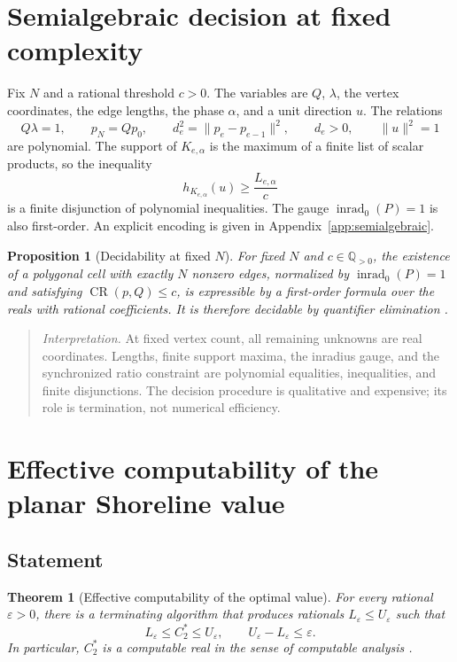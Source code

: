\documentclass[10pt,a4paper]{article}
\newtheorem{theorem}{Theorem}[section]
\newtheorem{proposition}[proposition]{Proposition}
\theoremstyle{definition}
\theoremstyle{remark}
\DeclareMathOperator{\inrad}{inrad}
\DeclareMathOperator{\CR}{CR}
\newcommand{\norm}[1]{\lVert #1\rVert}
\newcommand{\eps}{\varepsilon}
\begin{document}
\section{Semialgebraic decision at fixed complexity}
Fix $N$ and a rational threshold $c>0$. The variables are $Q$, $\lambda$, the vertex coordinates, the edge lengths, the phase $\alpha$, and a unit direction $u$. The relations
\[
Q\lambda=1,
\qquad
p_N=Qp_0,
\qquad
d_e^2=\norm{p_e-p_{e-1}}^2,
\qquad
d_e>0,
\qquad
\norm{u}^2=1
\]
are polynomial. The support of $K_{e,\alpha}$ is the maximum of a finite list of scalar products, so the inequality
\[
h_{K_{e,\alpha}}(u)\ge\frac{L_{e,\alpha}}{c}
\]
is a finite disjunction of polynomial inequalities. The gauge $\inrad_0(P)=1$ is also first-order. An explicit encoding is given in Appendix~\ref{app:semialgebraic}.

\begin{proposition}[Decidability at fixed $N$]
\label{prop:qe}
For fixed $N$ and $c\in\mathbb{Q}_{>0}$, the existence of a polygonal cell with exactly $N$ nonzero edges, normalized by $\inrad_0(P)=1$ and satisfying $\CR(p,Q)\le c$, is expressible by a first-order formula over the reals with rational coefficients. It is therefore decidable by quantifier elimination \cite{BasuPollackRoy}.
\end{proposition}

\begin{quote}\small
\textit{Interpretation.} At fixed vertex count, all remaining unknowns are real coordinates. Lengths, finite support maxima, the inradius gauge, and the synchronized ratio constraint are polynomial equalities, inequalities, and finite disjunctions. The decision procedure is qualitative and expensive; its role is termination, not numerical efficiency.
\end{quote}

\section{Effective computability of the planar Shoreline value}
\subsection{Statement}
\begin{theorem}[Effective computability of the optimal value]
\label{thm:computability}
For every rational $\eps>0$, there is a terminating algorithm that produces rationals $L_\eps\le U_\eps$ such that
\begin{equation}
L_\eps\le C_2^*\le U_\eps,
\qquad
U_\eps-L_\eps\le\eps.
\label{eq:computability-interval}
\end{equation}
In particular, $C_2^*$ is a computable real in the sense of computable analysis \cite{Weihrauch}.
\end{theorem}
\end{document}
